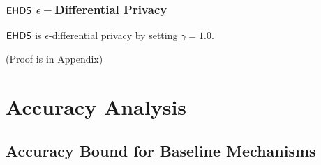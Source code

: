 \documentclass{article}
\begin{document}
\subsubsection{$\mathsf{EHDS}$ $\epsilon-$Differential Privacy}

\begin{lem}
\label{lem_hexpmech_privacy}
$\mathsf{EHDS}$ is $\epsilon$-differential privacy by setting $\gamma = 1.0$.
\end{lem}
(Proof is in Appendix)



\section{Accuracy Analysis}

\subsection{Accuracy Bound for Baseline Mechanisms}

\end{document}
